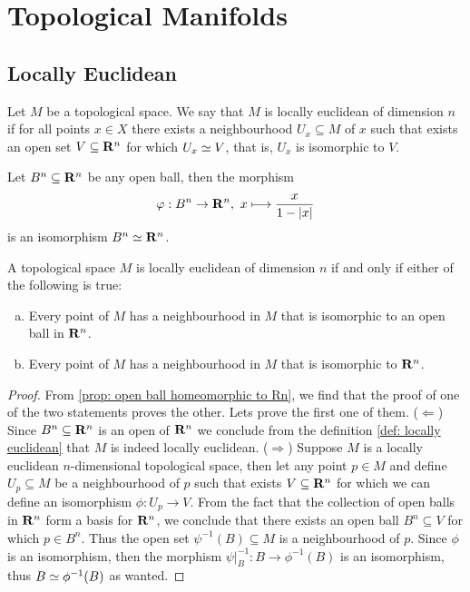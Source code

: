 \section{Topological Manifolds}

\subsection{Locally Euclidean}

\begin{definition}\label{def: locally euclidean}
Let \(M\) be a topological space. We say that \(M \) is locally euclidean of
dimension \(n\) if for all points \(x \in X\) there exists a neighbourhood
\(U_x \subseteq M\) of \(x\) such that exists an open set \(V \subseteq
\mathbf{R}^n\) for which \(U_x \simeq V\), that is, \(U_x\) is isomorphic to
\(V\).
\end{definition}

\begin{proposition}\label{prop: open ball homeomorphic to Rn}
Let \(B^n \subseteq \mathbf{R}^n\) be any open ball, then the morphism
\[
  \varphi: B^n \to \mathbf{R}^n,\ x \longmapsto \frac{x}{1 - |x|}
\]
is an isomorphism \(B^n \simeq \mathbf{R}^n\).
\end{proposition}

\begin{lemma}\label{lem:locally-euclidean-equivalences}
A topological space \(M\) is locally euclidean of dimension \(n\) if and only
if either of the following is true:
\begin{enumerate}[(a)]
  \item Every point of \(M\) has a neighbourhood in \(M\) that is isomorphic
    to an open ball in \(\mathbf{R}^n\).
  \item Every point of \(M\) has a neighbourhood in \(M\) that is isomorphic
    to \(\mathbf{R}^n\).
\end{enumerate}
\end{lemma}

\begin{proof}
From \cref{prop: open ball homeomorphic to Rn}, we find that the proof of one
of the two statements proves the other. Lets prove the first one of them.
(\(\Leftarrow\)) Since \(B^n \subseteq \mathbf{R}^n\) is an open of
\(\mathbf{R}^n\) we conclude from the definition \cref{def: locally euclidean}
that \(M\) is indeed locally euclidean.
(\(\Rightarrow\)) Suppose \(M\) is a locally euclidean \(n\)-dimensional
topological space, then let any point \(p \in M\) and define \(U_p \subseteq
M\) be a neighbourhood of \(p\) such that exists \(V \subseteq \mathbf{R}^n\)
for which we can define an isomorphism \(\phi : U_p \to V\). From the fact
that the collection of open balls in \(\mathbf{R}^n\) form a basis for
\(\mathbf{R}^n\), we conclude that there exists an open ball \(B^n \subseteq
V\) for which \(p \in B^n\). Thus the open set \(\psi^{-1}(B) \subseteq M\) is
a neighbourhood of \(p\). Since \(\phi\) is an isomorphism, then the
morphism \(\psi|_B^{-1} : B \to \phi^{-1}(B)\) is an isomorphism, thus \(B
\simeq \phi^{-1}(B)\) as wanted.
\end{proof}

